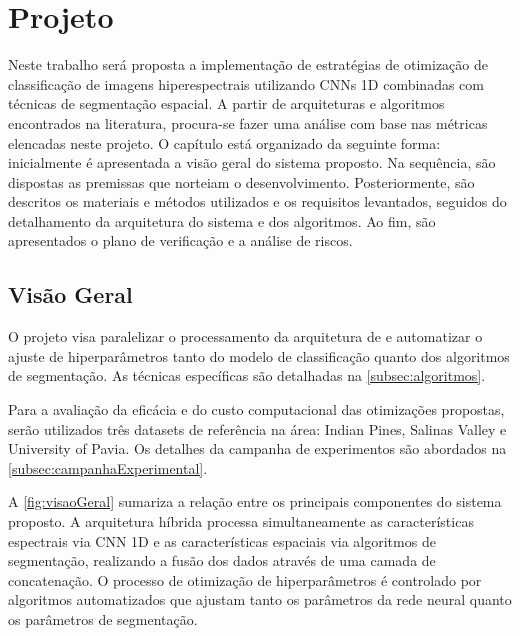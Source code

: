 \chapter{Projeto}
\label{cap:proj}

Neste trabalho será proposta a implementação de estratégias de otimização de classificação de imagens hiperespectrais utilizando CNNs 1D combinadas com técnicas de segmentação espacial. A partir de arquiteturas e algoritmos encontrados na literatura, procura-se fazer uma análise com base nas métricas elencadas neste projeto. O capítulo está organizado da seguinte forma: inicialmente é apresentada a visão geral do sistema proposto. Na sequência, são dispostas as premissas que norteiam o desenvolvimento. Posteriormente, são descritos os materiais e métodos utilizados e os requisitos levantados, seguidos do detalhamento da arquitetura do sistema e dos algoritmos. Ao fim, são apresentados o plano de verificação e a análise de riscos.

\section{Visão Geral}

O projeto visa paralelizar o processamento da arquitetura de  e automatizar o ajuste de hiperparâmetros tanto do modelo de classificação quanto dos algoritmos de segmentação. As técnicas específicas são detalhadas na \autoref{subsec:algoritmos}.

Para a avaliação da eficácia e do custo computacional das otimizações propostas, serão utilizados três datasets de referência na área: Indian Pines, Salinas Valley e University of Pavia. Os detalhes da campanha de experimentos são abordados na \autoref{subsec:campanhaExperimental}.

A \autoref{fig:visaoGeral} sumariza a relação entre os principais componentes do sistema proposto. A arquitetura híbrida processa simultaneamente as características espectrais via CNN 1D e as características espaciais via algoritmos de segmentação, realizando a fusão dos dados através de uma camada de concatenação. O processo de otimização de hiperparâmetros é controlado por algoritmos automatizados que ajustam tanto os parâmetros da rede neural quanto os parâmetros de segmentação.

